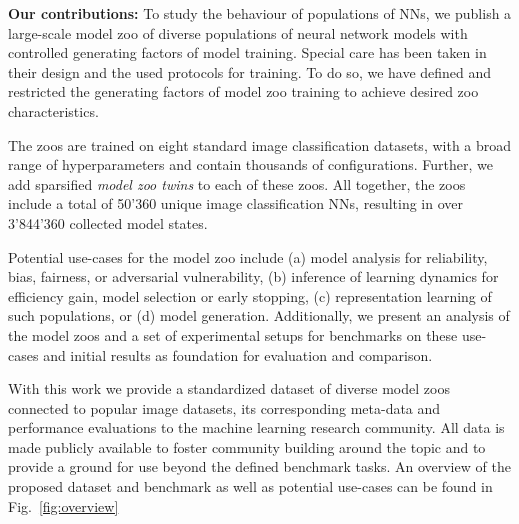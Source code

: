 %
%
\textbf{Our contributions:}
To study the behaviour of populations of NNs, we publish a large-scale model zoo of diverse populations of neural network models with controlled generating factors of model training.  
Special care has been taken in their design and the used protocols for training. To do so, we have defined and restricted the generating factors of model zoo training to achieve desired zoo 
characteristics.

%
%
The zoos are trained on eight standard image classification datasets, with a broad range of hyperparameters and contain thousands of configurations. Further, we add sparsified \textit{model zoo twins} to each of these zoos.
%
All together, the zoos include a total of 50'360 unique image classification NNs, resulting in over 3’844’360 collected model states.


%
%
Potential use-cases for the model zoo include (a) model analysis for reliability, bias, fairness, or adversarial vulnerability, (b) inference of learning dynamics for efficiency gain, model selection or early stopping, (c) representation learning of such populations, or (d) model generation.
%
%
Additionally, we present an analysis of the model zoos and a set of experimental setups for benchmarks on these use-cases and initial results as foundation for evaluation and comparison.



%
%
With this work we provide a standardized dataset of diverse model zoos connected to popular image datasets, its corresponding meta-data and performance evaluations to the machine learning research community. All data is made publicly available to foster community building around the topic and to provide a ground for use beyond the defined benchmark tasks. 
%
An overview of the proposed dataset and benchmark as well as potential use-cases can be found in Fig.~\ref{fig:overview}



